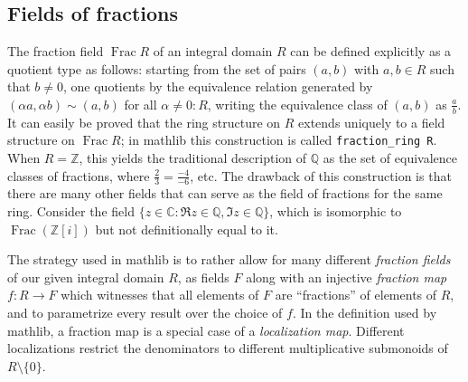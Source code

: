 \documentclass[a4paper,USenglish,cleveref, autoref, thm-restate]{lipics-v2021}
\newcommand{\C}{\mathbb{C}}
\newcommand{\lean}[1]{\texttt{#1}\xspace} %
\newcommand{\mathlib}{\textsf{mathlib}\xspace}
\newcommand{\Q}{\mathbb{Q}}
\newcommand{\Z}{\mathbb{Z}}
\DeclareMathOperator{\Frac}{Frac}
\begin{document}
\subsection{Fields of fractions}\label{subsection : fields of fractions}
The fraction field $\Frac R$ of an integral domain $R$ can be defined explicitly as a quotient type as follows:
starting from the set of pairs $(a,b)$ with $a,b \in R$ such that $b\neq 0$,
one quotients by the equivalence relation generated by $(\alpha a, \alpha b) \sim (a,b)$ for all $\alpha \ne 0 : R$, writing the equivalence class of $(a,b)$ as $\frac{a}{b}$.
It can easily be proved that the ring structure on $R$ extends uniquely to a field structure on $\Frac R$;
in \mathlib this construction is called \mbox{\lean{fraction\_ring R}}.
When $R=\Z$, this yields the traditional description of $\Q$ as the set of equivalence classes of fractions, where $\frac{2}{3}=\frac{-4}{-6}$, etc.
The drawback of this construction is that there are many other fields that can serve as the field of fractions for the same ring.
Consider the field $\{z \in \C : \Re z \in \Q, \Im z\in\Q\}$, which is isomorphic to $\Frac (\Z[i])$ but not definitionally equal to it.

The strategy used in \mathlib is to rather allow for many different \emph{fraction fields} of our given integral domain $R$,
as fields $F$ along with an injective \emph{fraction map} $f \colon R \to F$ which witnesses that all elements of $F$ are ``fractions'' of elements of $R$,
and to parametrize every result over the choice of $f$.
In the definition used by \mathlib, a fraction map is a special case of a \emph{localization map}.
Different localizations restrict the denominators to different multiplicative submonoids of $R\setminus\{0\}$.
\end{document}
